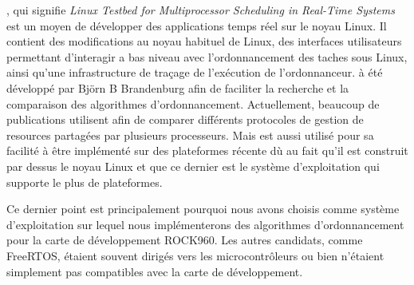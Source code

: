 \litmus, qui signifie \textit{Linux Testbed for Multiprocessor Scheduling in Real-Time Systems} est un moyen de développer des applications temps réel sur le noyau Linux. Il contient des modifications au noyau habituel de Linux, des interfaces utilisateurs permettant d’interagir a bas niveau avec l’ordonnancement des taches sous Linux, ainsi qu'une infrastructure de traçage de l'exécution de l’ordonnanceur.
\litmus à été développé par Björn B Brandenburg \cite{brandenburg2011scheduling} afin de faciliter la recherche et la comparaison des algorithmes d'ordonnancement. Actuellement, beaucoup de publications utilisent \litmus afin de comparer différents protocoles de gestion de resources partagées par plusieurs processeurs. Mais \litmus est aussi utilisé pour sa facilité à être implémenté sur des plateformes récente dù au fait qu'il est construit par dessus le noyau Linux et que ce dernier est le système d'exploitation qui supporte le plus de plateformes. 

Ce dernier point est principalement pourquoi nous avons choisis \litmus comme système d'exploitation sur lequel nous implémenterons des algorithmes d’ordonnancement pour la carte de développement ROCK960. Les autres candidats, comme FreeRTOS, étaient souvent dirigés vers les microcontrôleurs ou bien n'étaient simplement pas compatibles avec la carte de développement. 